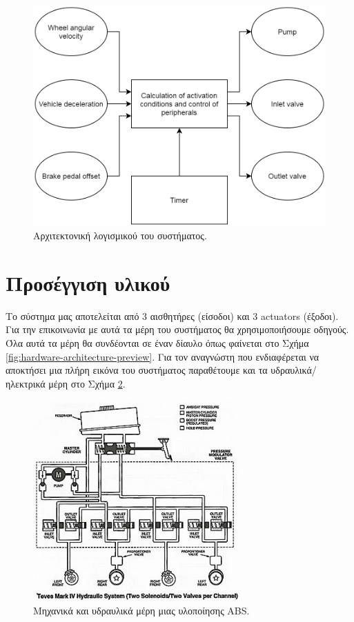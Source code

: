 \documentclass{article}
\begin{document}
\begin{figure}[H]
    \begin{center}
    \includegraphics[scale=0.30]{images/software-architecture-preview.png}
    \end{center}
    \caption{Αρχιτεκτονική λογισμικού του συστήματος.}
    \label{fig:software-architecture-preview}
\end{figure}


\section{Προσέγγιση υλικού}
Το σύστημα μας αποτελείται από 3 αισθητήρες (είσοδοι) και 3 actuators (έξοδοι). Για την επικοινωνία με αυτά τα μέρη του συστήματος θα χρησιμοποιήσουμε οδηγούς. Όλα αυτά τα μέρη θα συνδέονται σε έναν δίαυλο όπως φαίνεται στο Σχήμα \ref{fig:hardware-architecture-preview}.
Για τον αναγνώστη που ενδιαφέρεται να αποκτήσει μια πλήρη εικόνα του συστήματος παραθέτουμε και τα υδραυλικά/ηλεκτρικά μέρη στο Σχήμα \ref{fig:hydraulic-mechanical-system-preview}.

\begin{figure}[H]
    \begin{center}
    \includegraphics[scale=0.6]{images/hydraulic-mechanical-system-overview.jpg}
    \end{center}
    \caption{Μηχανικά και υδραυλικά μέρη μιας υλοποίησης ABS.}
    \label{fig:hydraulic-mechanical-system-preview}
\end{figure}
\end{document}
